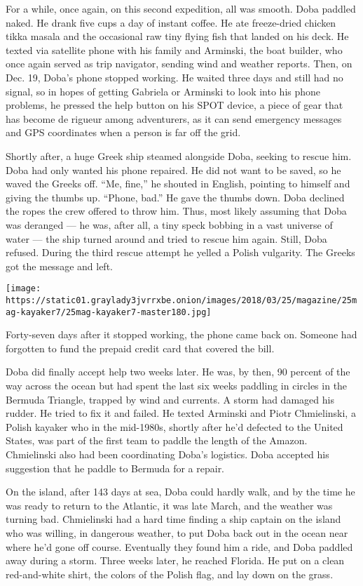 For a while, once again, on this second expedition, all was smooth. Doba
paddled naked. He drank five cups a day of instant coffee. He ate
freeze-dried chicken tikka masala and the occasional raw tiny flying
fish that landed on his deck. He texted via satellite phone with his
family and Arminski, the boat builder, who once again served as trip
navigator, sending wind and weather reports. Then, on Dec. 19, Doba's
phone stopped working. He waited three days and still had no signal, so
in hopes of getting Gabriela or Arminski to look into his phone
problems, he pressed the help button on his SPOT device, a piece of gear
that has become de rigueur among adventurers, as it can send emergency
messages and GPS coordinates when a person is far off the grid.

Shortly after, a huge Greek ship steamed alongside Doba, seeking to
rescue him. Doba had only wanted his phone repaired. He did not want to
be saved, so he waved the Greeks off. ``Me, fine,'' he shouted in
English, pointing to himself and giving the thumbs up. ``Phone, bad.''
He gave the thumbs down. Doba declined the ropes the crew offered to
throw him. Thus, most likely assuming that Doba was deranged --- he was,
after all, a tiny speck bobbing in a vast universe of water --- the ship
turned around and tried to rescue him again. Still, Doba refused. During
the third rescue attempt he yelled a Polish vulgarity. The Greeks got
the message and left.

\texttt{[image: https://static01.graylady3jvrrxbe.onion/images/2018/03/25/magazine/25mag-kayaker7/25mag-kayaker7-master180.jpg]}

Forty-seven days after it stopped working, the phone came back on.
Someone had forgotten to fund the prepaid credit card that covered the
bill.

Doba did finally accept help two weeks later. He was, by then, 90
percent of the way across the ocean but had spent the last six weeks
paddling in circles in the Bermuda Triangle, trapped by wind and
currents. A storm had damaged his rudder. He tried to fix it and failed.
He texted Arminski and Piotr Chmielinski, a Polish kayaker who in the
mid-1980s, shortly after he'd defected to the United States, was part of
the first team to paddle the length of the Amazon. Chmielinski also had
been coordinating Doba's logistics. Doba accepted his suggestion that he
paddle to Bermuda for a repair.

On the island, after 143 days at sea, Doba could hardly walk, and by the
time he was ready to return to the Atlantic, it was late March, and the
weather was turning bad. Chmielinski had a hard time finding a ship
captain on the island who was willing, in dangerous weather, to put Doba
back out in the ocean near where he'd gone off course. Eventually they
found him a ride, and Doba paddled away during a storm. Three weeks
later, he reached Florida. He put on a clean red-and-white shirt, the
colors of the Polish flag, and lay down on the grass.

